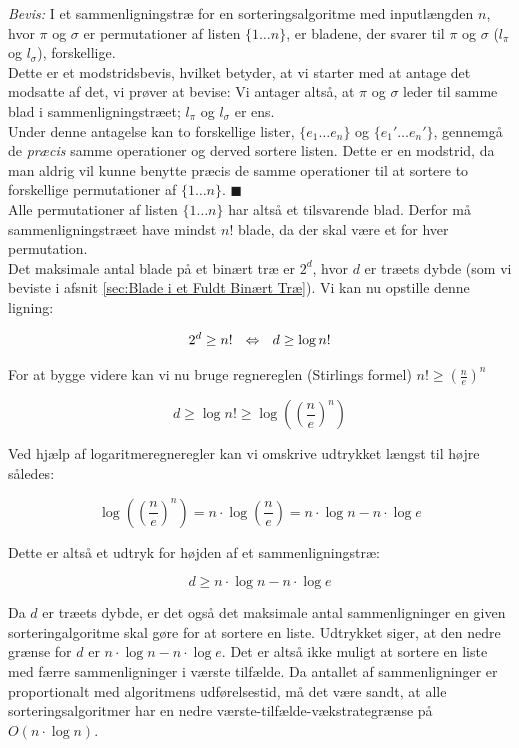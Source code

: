 \emph{Bevis:} I et sammenligningstræ for en sorteringsalgoritme med inputlængden $n$, hvor $\pi$ og $\sigma$ er permutationer af listen $\{1 \dots n\}$, er bladene, der svarer til $\pi$ og $\sigma$ ($l_{\pi}$ og $l_{\sigma}$), forskellige.\\

Dette er et modstridsbevis, hvilket betyder, at vi starter med at antage det modsatte af det, vi prøver at bevise: Vi antager altså, at $\pi$ og $\sigma$ leder til samme blad i sammenligningstræet; $l_{\pi}$ og $l_{\sigma}$ er ens.\\

Under denne antagelse kan to forskellige lister, $\{e_1 \dots e_n\}$ og $\{e_1' \dots e_n'\}$, gennemgå de \emph{præcis} samme operationer og derved sortere listen. Dette er en modstrid, da man aldrig vil kunne benytte præcis de samme operationer til at sortere to forskellige permutationer af $\{1 \dots n\}$. $\blacksquare$ \\


Alle permutationer af listen $\{1 \dots n\}$ har altså et tilsvarende blad. Derfor må sammenligningstræet have mindst $n!$ blade, da der skal være et for hver permutation.\\

Det maksimale antal blade på et binært træ er $2^d$, hvor $d$ er træets dybde (som vi beviste i afsnit \ref{sec:Blade i et Fuldt Binært Træ}). Vi kan nu opstille denne ligning:


$$2^d \geq n! \:\:\:\Leftrightarrow\:\:\: d \geq \log n!$$

For at bygge videre kan vi nu bruge regnereglen (Stirlings formel) $n! \geq \left( \frac{n}{e} \right)^n$ 

$$d \geq \log n! \geq \log \left(\left(\frac{n}{e}\right)^n\right)$$

Ved hjælp af logaritmeregneregler kan vi omskrive udtrykket længst til højre således:

$$\log \left(\left(\frac{n}{e}\right)^n\right) = n \cdot \log \left(\frac{n}{e} \right) = n \cdot \log n - n \cdot \log e$$

Dette er altså et udtryk for højden af et sammenligningstræ:

$$d \geq n \cdot \log n - n \cdot \log e$$

Da $d$ er træets dybde, er det også det maksimale antal sammenligninger en given sorteringalgoritme skal gøre for at sortere en liste. Udtrykket siger, at den nedre grænse for $d$ er $n \cdot \log n - n \cdot \log e$. Det er altså ikke muligt at sortere en liste med færre sammenligninger i værste tilfælde. Da antallet af sammenligninger er proportionalt med algoritmens udførelsestid, må det være sandt, at alle sorteringsalgoritmer har en nedre værste-tilfælde-vækstrategrænse på $O(n \cdot \log n)$.


